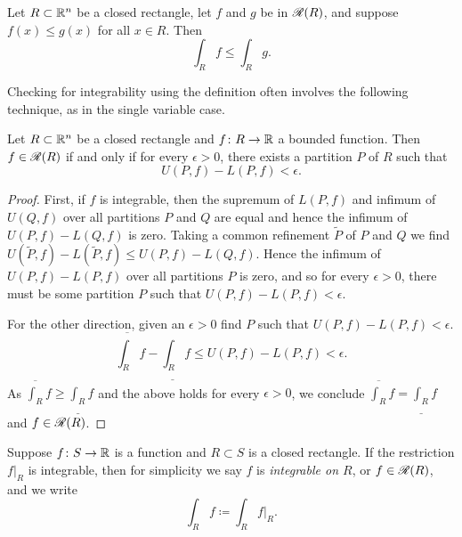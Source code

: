 \begin{prop}[Monotonicity]
Let $R \subset {\mathbb{R}}^n$ be a closed rectangle, let
$f$ and $g$ be in ${\mathscr{R}}(R)$, and suppose $f(x) \leq g(x)$
for all $x \in R$.  Then
\begin{equation*}
\int_R f 
\leq
\int_R g .
\end{equation*}
\end{prop}

Checking for integrability using the definition often involves the following
technique, as in the single variable case.

\begin{prop} \label{mv:prop:upperlowerepsilon}
Let $R \subset {\mathbb{R}}^n$ be a closed rectangle and
$f \colon R \to {\mathbb{R}}$ a bounded function.
Then $f \in {\mathscr{R}}(R)$ if and only if
for every $\epsilon > 0$, there exists a partition $P$ of $R$
such that
\begin{equation*}
U(P,f) - L(P,f) < \epsilon .
\end{equation*}
\end{prop}

\begin{proof}
First, if $f$ is integrable, then the supremum of $L(P,f)$ and
infimum of $U(Q,f)$ over all partitions $P$ and $Q$ are equal and hence the
infimum of $U(P,f)-L(Q,f)$ is zero.  Taking a common refinement
$\widetilde{P}$ of $P$ and $Q$ we find
$U(\widetilde{P},f)-L(\widetilde{P},f) \leq U(P,f)-L(Q,f)$.
Hence the infimum of $U(P,f)-L(P,f)$ over all partitions $P$ is zero, and
so for every $\epsilon > 0$, there must be some partition $P$ such that 
$U(P,f) - L(P,f) < \epsilon$.

For the other direction, given an $\epsilon > 0$ find $P$ such that
$U(P,f) - L(P,f) < \epsilon$.
\begin{equation*}
\overline{\int_R} f - 
\underline{\int_R} f 
\leq
U(P,f) - L(P,f)
< \epsilon .
\end{equation*}
As $\overline{\int_R} f \geq \underline{\int_R} f$ and the above holds for
every $\epsilon > 0$, we conclude 
$\overline{\int_R} f = \underline{\int_R} f$ and $f \in {\mathscr{R}}(R)$.
\end{proof}

Suppose $f \colon S \to {\mathbb{R}}$ is a function and $R \subset S$
is a closed rectangle.  If the restriction $f|_R$ is integrable,
then for simplicity we
say $f$ is \emph{integrable on $R$}, or
$f \in {\mathscr{R}}(R)$, and we
write
\begin{equation*}
\int_R f \coloneqq \int_R f|_R .
\end{equation*}

